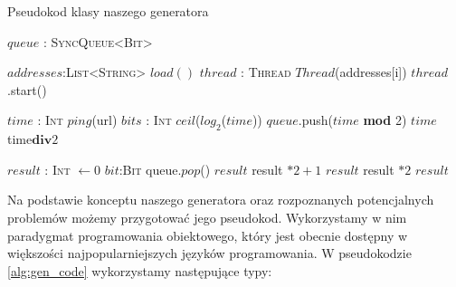{\small
\begin{pseudokod}
\caption{Pseudokod klasy naszego generatora}
\label{alg:gen_code}
\begin{algorithmic}%
    \State $queue$ : \textsc{SyncQueue<Bit>} 
    \item[]
        \State $addresses$:\textsc{List<String>} \gets $load()$ 
            \State $thread$ : \textsc{Thread} \gets $Thread$(addresses[i]) 
            \State $thread$.start() 
        \EndFor
    \EndConstructor
    \item[]
        \Loop
            \State $time$ : \textsc{Int} \gets $ping$(url) 
            \State $bits$ : \textsc{Int} \gets $ceil$($log_2$($time$)) 
                \State $queue$.push($time$ \textbf{mod} 2) 
                \State $time$ \gets time$ \textbf{div} 2$ 
            \EndFor
        \EndLoop
    \EndProcedure
    \item[]
        \State $result$ : \textsc{Int} $\gets 0$
            \State $bit$:\textsc{Bit} \gets queue.$pop$() 
                \State $result$ \gets result $ * 2 + 1$ 
            \Else
                \State $result$ \gets result $ * 2$ 
            \EndIf
        \EndFor
        \State \Return $result$ 
    \EndFunction
\EndClass
\end{algorithmic}
\end{pseudokod}
}
Na podstawie konceptu naszego generatora oraz rozpoznanych potencjalnych problemów możemy przygotować jego pseudokod. Wykorzystamy w nim paradygmat programowania obiektowego, który jest obecnie dostępny w większości najpopularniejszych języków programowania. W pseudokodzie \ref{alg:gen_code} wykorzystamy następujące typy:
